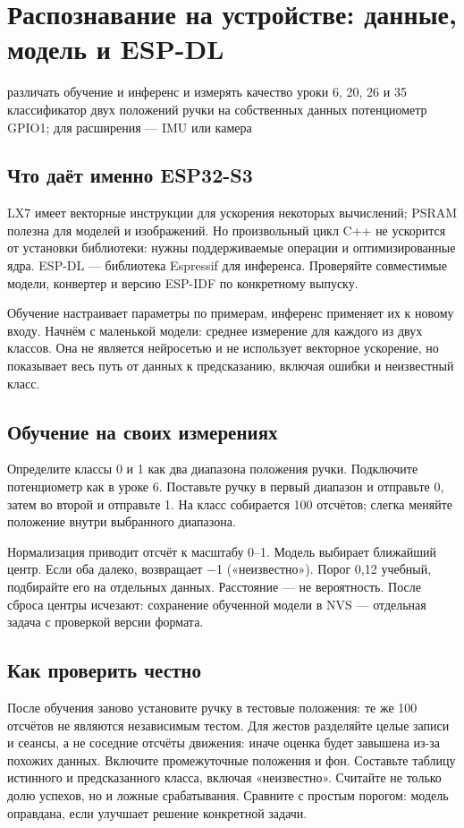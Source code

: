 \section{Распознавание на устройстве: данные, модель и ESP-DL}\label{les:edge-ai}
\lessonintro
  {различать обучение и инференс и измерять качество}
  {уроки 6, 20, 26 и 35}
  {классификатор двух положений ручки на собственных данных}
  {потенциометр GPIO1; для расширения --- IMU или камера}

\subsection{Что даёт именно ESP32-S3}
LX7 имеет векторные инструкции для ускорения некоторых вычислений; PSRAM полезна для моделей
и изображений. Но произвольный цикл C++ не ускорится от установки библиотеки: нужны
поддерживаемые операции и оптимизированные ядра. ESP-DL --- библиотека Espressif для инференса.
Проверяйте совместимые модели, конвертер и версию ESP-IDF по конкретному выпуску.

Обучение настраивает параметры по примерам, инференс применяет их к новому входу.
Начнём с маленькой модели: среднее измерение для каждого из двух классов.
Она не является нейросетью и не использует векторное ускорение, но показывает весь путь
от данных к предсказанию, включая ошибки и неизвестный класс.

\subsection{Обучение на своих измерениях}
Определите классы 0 и 1 как два диапазона положения ручки. Подключите потенциометр как в уроке 6.
Поставьте ручку в первый диапазон и отправьте 0, затем во второй и отправьте 1.
На класс собирается 100 отсчётов; слегка меняйте положение внутри выбранного диапазона.


Нормализация приводит отсчёт к масштабу 0--1. Модель выбирает ближайший центр.
Если оба далеко, возвращает −1 («неизвестно»). Порог 0,12 учебный, подбирайте его
на отдельных данных. Расстояние --- не вероятность. После сброса центры исчезают:
сохранение обученной модели в NVS --- отдельная задача с проверкой версии формата.

\subsection{Как проверить честно}
После обучения заново установите ручку в тестовые положения: те же 100 отсчётов не являются
независимым тестом. Для жестов разделяйте целые записи и сеансы, а не соседние отсчёты движения:
иначе оценка будет завышена из-за похожих данных. Включите промежуточные положения и фон.
Составьте таблицу истинного и предсказанного класса, включая «неизвестно».
Считайте не только долю успехов, но и ложные срабатывания. Сравните с простым порогом:
модель оправдана, если улучшает решение конкретной задачи.

